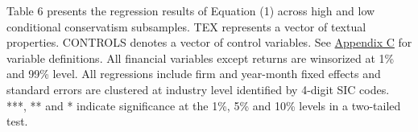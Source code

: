 \begin{table}
\begin{footnotesize}
			\noindent Table 6 presents the regression results of Equation (1) across high and low conditional conservatism subsamples. TEX represents a vector of textual properties. CONTROLS denotes a vector of control variables. See \hyperref[appc]{Appendix C} for variable definitions. All financial variables except returns are winsorized at 1\% and 99\% level. All regressions include firm and year-month fixed effects and standard errors are clustered at industry level identified by 4-digit SIC codes. ***, ** and * indicate significance at the 1\%, 5\% and 10\% levels in a two-tailed test.
		\end{footnotesize}
\end{table}%